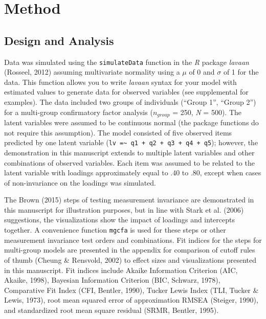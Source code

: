 \documentclass[
  man]{apa7}
\begin{document}
\hypertarget{method}{%
\section{Method}\label{method}}

\hypertarget{design-and-analysis}{%
\subsection{Design and Analysis}\label{design-and-analysis}}

Data was simulated using the \texttt{simulateData} function in the \emph{R} package \emph{lavaan} (Rosseel, 2012) assuming multivariate normality using a \(\mu\) of 0 and \(\sigma\) of 1 for the data. This function allows you to write \emph{lavaan} syntax for your model with estimated values to generate data for observed variables (see supplemental for examples). The data included two groups of individuals (``Group 1'', ``Group 2'') for a multi-group confirmatory factor analysis (\(n_{group}\) = 250, \emph{N} = 500). The latent variables were assumed to be continuous normal (the package functions do not require this assumption). The model consisted of five observed items predicted by one latent variable (\texttt{lv\ =\textasciitilde{}\ q1\ +\ q2\ +\ q3\ +\ q4\ +\ q5}); however, the demonstration in this manuscript extends to multiple latent variables and other combinations of observed variables. Each item was assumed to be related to the latent variable with loadings approximately equal to .40 to .80, except when cases of non-invariance on the loadings was simulated.

The Brown (2015) steps of testing measurement invariance are demonstrated in this manuscript for illustration purposes, but in line with Stark et al. (2006) suggestions, the visualizations show the impact of loadings and intercepts together. A convenience function \texttt{mgcfa} is used for these steps or other measurement invariance test orders and combinations. Fit indices for the steps for multi-group models are presented in the appendix for comparison of cutoff rules of thumb (Cheung \& Rensvold, 2002) to effect sizes and visualizations presented in this manuscript. Fit indices include Akaike Information Criterion (AIC, Akaike, 1998), Bayesian Information Criterion (BIC, Schwarz, 1978), Comparative Fit Index (CFI, Bentler, 1990), Tucker Lewis Index (TLI, Tucker \& Lewis, 1973), root mean squared error of approximation RMSEA (Steiger, 1990), and standardized root mean square residual (SRMR, Bentler, 1995).
\end{document}
